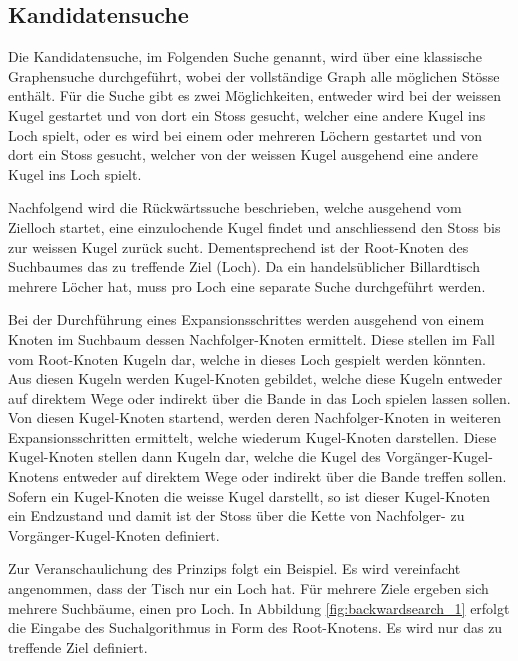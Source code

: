 \subsection{Kandidatensuche}\label{sec:kandidatensuche}
Die Kandidatensuche, im Folgenden Suche genannt, wird über eine klassische Graphensuche durchgeführt, wobei der vollständige
Graph alle möglichen Stösse enthält.
Für die Suche gibt es zwei Möglichkeiten, entweder wird bei der weissen Kugel gestartet und von dort ein Stoss gesucht,
welcher eine andere Kugel ins Loch spielt, oder es wird bei einem oder mehreren Löchern gestartet und von dort ein Stoss gesucht,
welcher von der weissen Kugel ausgehend eine andere Kugel ins Loch spielt.

Nachfolgend wird die Rückwärtssuche beschrieben, welche ausgehend vom Zielloch startet, eine einzulochende Kugel findet
und anschliessend den Stoss bis zur weissen Kugel zurück sucht.
Dementsprechend ist der Root-Knoten des Suchbaumes das zu treffende Ziel (Loch).
Da ein handelsüblicher Billardtisch mehrere Löcher hat, muss pro Loch eine separate Suche durchgeführt werden.

Bei der Durchführung eines Expansionsschrittes werden ausgehend von einem Knoten im Suchbaum dessen Nachfolger-Knoten ermittelt.
Diese stellen im Fall vom Root-Knoten Kugeln dar, welche in dieses Loch gespielt werden könnten.
Aus diesen Kugeln werden Kugel-Knoten gebildet, welche diese Kugeln entweder auf direktem Wege oder indirekt über die Bande
in das Loch spielen lassen sollen.
Von diesen Kugel-Knoten startend, werden deren Nachfolger-Knoten in weiteren Expansionsschritten ermittelt, welche
wiederum Kugel-Knoten darstellen.
Diese Kugel-Knoten stellen dann Kugeln dar, welche die Kugel des Vorgänger-Kugel-Knotens entweder auf direktem Wege oder indirekt
über die Bande treffen sollen.
Sofern ein Kugel-Knoten die weisse Kugel darstellt, so ist dieser Kugel-Knoten ein Endzustand und damit ist der Stoss
über die Kette von Nachfolger- zu Vorgänger-Kugel-Knoten definiert.

Zur Veranschaulichung des Prinzips folgt ein Beispiel. Es wird vereinfacht angenommen,
dass der Tisch nur ein Loch hat. Für mehrere Ziele ergeben sich mehrere Suchbäume, einen pro Loch.
In Abbildung \ref{fig:backwardsearch_1} erfolgt die Eingabe des Suchalgorithmus in Form des Root-Knotens.
Es wird nur das zu treffende Ziel definiert.


